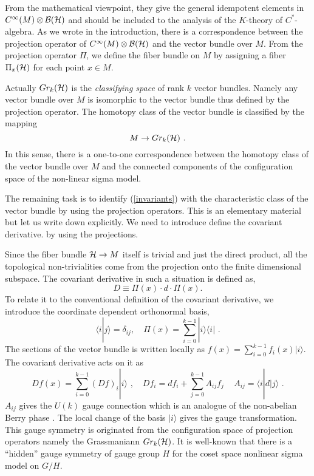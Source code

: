 \documentclass[a4paper,12pt]{article}
\begin{document}
{}From the mathematical viewpoint,
they give the general idempotent elements
in $C^\infty(M)\otimes {\cal B}({\cal H})$
and should be included to the analysis of the $K$-theory
of $C^*$-algebra.
As we wrote in the introduction, there is a correspondence
between the projection operator of $C^\infty(M)\otimes {\cal B}({\cal H})$
and the vector bundle over $M$. From the projection operator
$\Pi$, we define the fiber bundle on $M$ by
assigning a fiber $\Pi_x({\cal H})$ for each point $x\in M$.

Actually $Gr_k({\cal H})$ is the {\em classifying space}
of rank $k$ vector bundles.  Namely
any vector bundle over $M$ is isomorphic to
the vector bundle thus defined by the projection
operator. The homotopy class of the vector bundle
is classified by the mapping
\begin{equation}
 M\rightarrow Gr_k({\cal H})\,\,.
\end{equation}
In this sense, there is a one-to-one correspondence between
the homotopy class of the vector bundle over $M$ and
the connected components of the configuration
space of the non-linear sigma model.

The remaining task is to identify (\ref{invariants})
with the characteristic class of the vector bundle
by using the projection operators.
This is an elementary material but let us write down
explicitly. We need to introduce define the covariant derivative.
by using the projections.

Since the fiber bundle
${\cal H}\rightarrow M$ itself is trivial and just the direct product,
all the topological non-trivialities come from the projection
onto the finite dimensional subspace.
The covariant derivative in such a situation is defined as,
\begin{equation}
 D \equiv \Pi(x) \cdot d\cdot \Pi(x).
\end{equation}
To relate it to the conventional definition
of the covariant derivative, we introduce the coordinate
dependent orthonormal basis,
\begin{equation}
 \langle i |j \rangle =\delta_{ij},\quad
 \Pi(x) =\sum_{i=0}^{k-1} |i \rangle \langle i|\,\,.
\end{equation}
The sections of the vector bundle is written locally 
as $f(x)=\sum_{i=0}^{k-1} f_i(x)|i\rangle$. 
The covariant derivative acts on it as
\begin{equation}
 D f(x) = \sum_{i=0}^{k-1} (Df)_i |i\rangle\,\,,\quad
 Df_i = df_i +\sum_{j=0}^{k-1}  A_{ij} f_j\,\quad
 A_{ij} = \langle i | d | j\rangle\,\,.
\end{equation}
$A_{ij}$ gives the  $U(k)$ gauge connection
which is an analogue of the  non-abelian Berry phase \cite{r:Berry}.
The local change of the basis $|i\rangle$ gives the
gauge transformation.
This gauge symmetry is originated from
the configuration space of projection operators
namely the Grassmaniann $Gr_k({\cal H})$.
It is well-known that there is a ``hidden''
gauge symmetry of gauge group $H$ for the 
coset space nonlinear sigma model on $G/H$.
\end{document}
